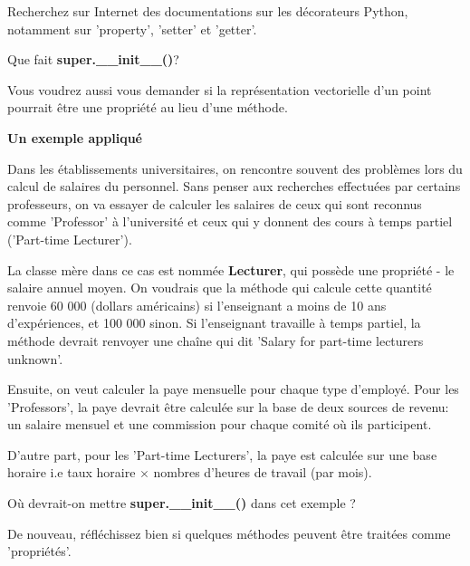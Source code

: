 \begin{Exercice}[10 minutes]
\begin{conseil}
Recherchez sur Internet des documentations sur les décorateurs Python, notamment sur 'property', 'setter' et 'getter'. 

Que fait \textbf{super.\_\_init\_\_()}?

Vous voudrez aussi vous demander si la représentation vectorielle d'un point pourrait être une propriété au lieu d'une méthode. 
\end{conseil}
\begin{solution}
 
\end{solution}
\end{Exercice} 

\begin{Exercice}[15 minutes]\textbf{Un exemple appliqué}

Dans les établissements universitaires, on rencontre souvent des problèmes lors du calcul de salaires du personnel. Sans penser aux recherches effectuées par certains professeurs, on va essayer de calculer les salaires de ceux qui sont reconnus comme 'Professor' à l'université et ceux qui y donnent des cours à temps partiel ('Part-time Lecturer').

La classe mère dans ce cas est nommée \textbf{Lecturer}, qui possède une propriété - le salaire annuel moyen. On voudrais que la méthode qui calcule cette quantité renvoie 60 000 (dollars américains) si l'enseignant a moins de 10 ans d'expériences, et 100 000 sinon. Si l'enseignant travaille à temps partiel, la méthode devrait renvoyer une chaîne qui dit 'Salary for part-time lecturers unknown'.

Ensuite, on veut calculer la paye mensuelle pour chaque type d'employé. Pour les 'Professors', la paye devrait être calculée sur la base de deux sources de revenu: un salaire mensuel et une commission pour chaque comité où ils participent. 

D'autre part, pour les 'Part-time Lecturers', la paye est calculée sur une base horaire i.e taux horaire $\times$ nombres d'heures de travail (par mois).
 

\begin{conseil}
Où devrait-on mettre \textbf{super.\_\_init\_\_()} dans cet exemple ?

De nouveau, réfléchissez bien si quelques méthodes peuvent être traitées comme 'propriétés'.
\end{conseil}

\begin{solution}
 
\end{solution}
\end{Exercice}



